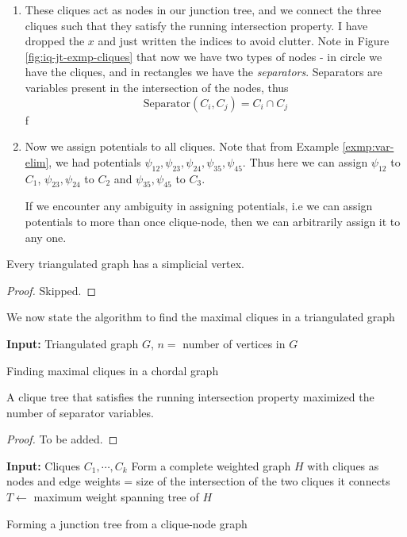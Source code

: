\begin{exmp}
\begin{enumerate}
		\item These cliques act as nodes in our junction tree, and we connect the three cliques such that they satisfy the running intersection property. I have dropped the $x$ and just written the indices to avoid clutter. Note in Figure \ref{fig:iq-jt-exmp-cliques} that now we have two types of nodes - in circle we have the cliques, and in rectangles we have the \textit{separators}. Separators are variables present in the intersection of the nodes, thus
		\begin{equation}
		\text{Separator}(C_i, C_j) = C_i \cap C_j
		\end{equation}
	f
		\item Now we assign potentials to all cliques. Note that from Example \ref{exmp:var-elim}, we had potentials $\psi_{12}, \psi_{23}, \psi_{24}, \psi_{35},\psi_{45}$. Thus here we can assign $\psi_{12}$ to $C_1$, $\psi_{23}, \psi_{24}$ to $C_2$ and $\psi_{35}, \psi_{45}$ to $C_3$. 
		\begin{rem}
		If we encounter any ambiguity in assigning potentials, i.e we can assign potentials to more than once clique-node, then we can arbitrarily assign it to any one.
		\end{rem}
	\end{enumerate}
\end{exmp}
\begin{thm}
Every triangulated graph has a simplicial vertex.
\end{thm}
\begin{proof}
Skipped.
\end{proof}
We now state the algorithm to find the maximal cliques in a triangulated graph \\
\begin{algorithm}[H]\label{alg:cliques-chordal}
	\DontPrintSemicolon
	\textbf{Input:} Triangulated graph $G$, $n=$ number of vertices in $G$\;
	\caption{Finding maximal cliques in a chordal graph}
\end{algorithm}
\begin{thm}
A clique tree that satisfies the running intersection property maximized the number of separator variables.
\end{thm}
\begin{proof}
To be added.
\end{proof}
\begin{algorithm}[H]\label{alg:cliques-jt}
	\DontPrintSemicolon
	\textbf{Input:} Cliques $C_1, \cdots, C_k$\;
	Form a complete weighted graph $H$ with cliques as nodes and edge weights = size of the intersection of the two cliques it connects \;
	$T \longleftarrow$ maximum weight spanning tree of $H$\;
	\caption{Forming a junction tree from a clique-node graph}
\end{algorithm}